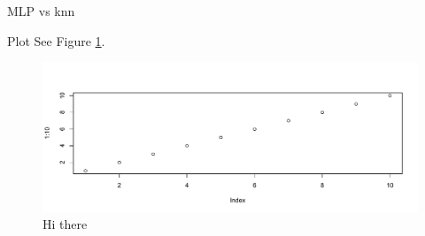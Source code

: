 \documentclass[
  ignorenonframetext,
]{article}
\begin{document}
\begin{frame}[fragile]{MLP vs knn}
\begin{block}{Plot}
\protect\hypertarget{plot}{}
See Figure \ref{fig:foo}.

\begin{figure}

{\centering \includegraphics{_main_files/figure-beamer/foo-1} 

}

\caption{Hi there}\label{fig:foo}
\end{figure}
\end{block}
\end{frame}
\end{document}
